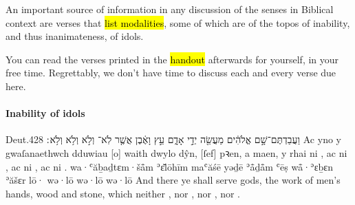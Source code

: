 \begin{paper}
	An important source of information in any discussion of the senses in Biblical context are verses that \hl{list modalities}, some of which are of the topos of inability, and thus inanimateness, of idols.

	You can read the verses printed in the \hl{handout} afterwards for yourself, in your free time. Regrettably, we don’t have time to discuss each and every verse due here.
\end{paper}



\paragraph{Inability of idols}

\begin{example}{Deut.}{4}{28}{}{}
	\quoling
	{וַעֲבַדְתֶּם־שָׁ֣ם אֱלֹהִ֔ים מַעֲשֵׂ֖ה יְדֵ֣י אָדָ֑ם עֵ֣ץ וָאֶ֔בֶן אֲשֶׁ֤ר לֹֽא־ וְלֹ֣א  וְלֹ֥א  וְלֹ֥א ׃}
	{Ac yno y gwaſanaethwch dduwiau [o] waith dwylo dŷn, [ſef] pꝛen, a maen, y rhai ni , ac ni , ac ni , ac ni .}
	{wa·ʿăḇaḏtɛm·šå̄m ʾɛ̆lōhīm maʿăśē yəḏē ʾå̄ḏå̄m ʿēṣ wå̄·ʾɛḇɛn ʾăšɛr lō· wə·lō  wə·lō  wə·lō }
	{And there ye shall serve gods, the work of men’s hands, wood and stone, which neither , nor , nor , nor .}
\end{example}

